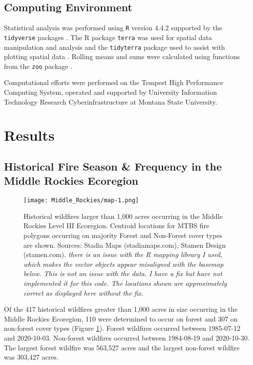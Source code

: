 \documentclass[11pt]{article}
\begin{document}
\subsection{Computing Environment}

Statistical analysis was performed using \texttt{R} version 4.4.2 \citep{rcoreteamLanguageEnvironmentStatistical2024} supported by the \texttt{tidyverse} packages \citep{hernangomezUsingTidyverseTerra2023} .  The R package \texttt{terra} was used for spatial data manipulation and analysis \citep{hijmansTerraSpatialData2024} and the \texttt{tidyterra} package used to assist with plotting spatial data \citep{hernangomezUsingTidyverseTerra2023}.  Rolling means and sums were calculated using functions from the \texttt{zoo} package \citep{zeileisZooS3Infrastructure2005}.  

Computational efforts were performed on the Tempest High Performance Computing System, operated and supported by University Information Technology Research Cyberinfrastructure at Montana State University.

\section{Results}

\subsection{Historical Fire Season \& Frequency in the Middle Rockies Ecoregion}

\begin{figure}[ht]
  \texttt{[image: Middle\_Rockies/map-1.png]}
  \caption{Historical wildfires larger than 1,000 acres occurring in the Middle Rockies Level III Ecoregion.  Centroid locations for MTBS fire polygons occurring on majority Forest and Non-Forest cover types are shown.  Sources: Stadia Maps (stadiamaps.com), Stamen Design (stamen.com). \textit{there is an issue with the R mapping library I used, which makes the vector objects appear misaligned with the basemap below.  This is not an issue with the data. I have a fix but have not implemented it for this code.  The locations shown are approximately correct as displayed here without the fix.}}
  \label{fig:map}
\end{figure}

Of the 417 historical wildfires greater than 1,000 acres in size occurring in the Middle Rockies Ecoregion, 110 were determined to occur on forest and 307 on non-forest cover types (Figure \ref{fig:map}).  Forest wildfires occurred between 1985-07-12 and 2020-10-03.  Non-forest wildfires occurred between 1984-08-19 and 2020-10-30.  The largest forest wildfire was 563,527 acres and the largest non-forest wildfire was 303,427 acres.
\end{document}
